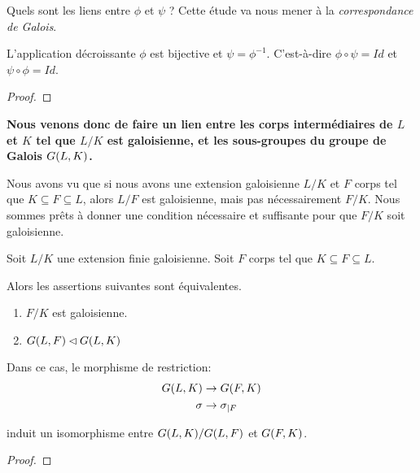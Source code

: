 Quels sont les liens entre $\phi$ et $\psi$ ?
Cette étude va nous mener à la \textit{correspondance de Galois}.

\begin{theorem}
	\label{theorem:galois_correspondance}
	L'application décroissante $\phi$ est bijective et $\psi = \phi^{-1}$.
	C'est-à-dire $\phi \circ \psi = Id$ et $\psi \circ \phi = Id$.
\end{theorem}

\ifdefined\outputproof
\begin{proof}

\end{proof}
\fi

\textbf{Nous venons donc de faire un lien entre les corps intermédiaires de $L$ et
$K$ tel que $L/K$ est galoisienne, et les sous-groupes du groupe de Galois
$G(L, K)$.}

Nous avons vu que si nous avons une extension galoisienne $L/K$ et $F$ corps tel
que $K \subseteq F \subseteq L$, alors $L/F$ est galoisienne, mais pas
nécessairement $F/K$.
Nous sommes prêts à donner une condition nécessaire et suffisante pour que $F/K$
soit galoisienne.

\begin{proposition}
	Soit $L/K$ une extension finie galoisienne. Soit $F$ corps tel que $K
	\subseteq F \subseteq L$.

	Alors les assertions suivantes sont équivalentes.
	\begin{enumerate}
		\item $F/K$ est galoisienne.
		\item $G(L, F) \lhd G(L, K)$
	\end{enumerate}

	Dans ce cas, le morphisme de restriction:
	\begin{align}
		G(L, K) &\rightarrow G(F, K) \\
		\sigma &\rightarrow \sigma_{|F}
	\end{align}

	induit un isomorphisme entre $G(L, K)/G(L, F)$ et
	$G(F, K)$.
\end{proposition}

\ifdefined\outputproof
\begin{proof}

\end{proof}
\fi
